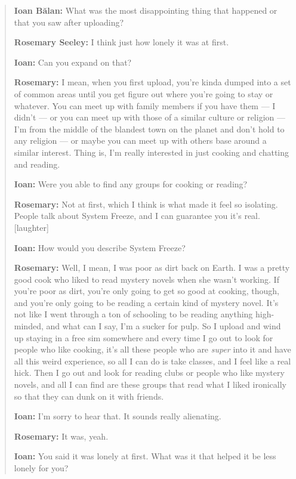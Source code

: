 \begin{quote}
\textbf{Ioan Bălan:} What was the most disappointing thing that happened or that you saw after uploading?

\textbf{Rosemary Seeley:} I think just how lonely it was at first.

\textbf{Ioan:} Can you expand on that?

\textbf{Rosemary:} I mean, when you first upload, you're kinda dumped into a set of common areas until you get figure out where you're going to stay or whatever. You can meet up with family members if you have them — I didn't — or you can meet up with those of a similar culture or religion — I'm from the middle of the blandest town on the planet and don't hold to any religion — or maybe you can meet up with others base around a similar interest. Thing is, I'm really interested in just cooking and chatting and reading.

\textbf{Ioan:} Were you able to find any groups for cooking or reading?

\textbf{Rosemary:} Not at first, which I think is what made it feel so isolating. People talk about System Freeze, and I can guarantee you it's real. {[}laughter{]}

\textbf{Ioan:} How would you describe System Freeze?

\textbf{Rosemary:} Well, I mean, I was poor as dirt back on Earth. I was a pretty good cook who liked to read mystery novels when she wasn't working. If you're poor as dirt, you're only going to get so good at cooking, though, and you're only going to be reading a certain kind of mystery novel. It's not like I went through a ton of schooling to be reading anything high-minded, and what can I say, I'm a sucker for pulp. So I upload and wind up staying in a free sim somewhere and every time I go out to look for people who like cooking, it's all these people who are \emph{super} into it and have all this weird experience, so all I can do is take classes, and I feel like a real hick. Then I go out and look for reading clubs or people who like mystery novels, and all I can find are these groups that read what I liked ironically so that they can dunk on it with friends.

\textbf{Ioan:} I'm sorry to hear that. It sounds really alienating.

\textbf{Rosemary:} It was, yeah.

\textbf{Ioan:} You said it was lonely at first. What was it that helped it be less lonely for you?


\end{quote}
